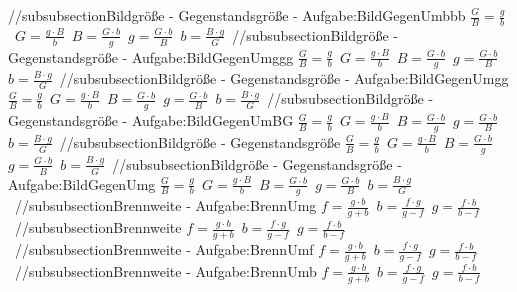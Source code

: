 //subsubsection{Bildgröße - Gegenstandsgröße - Aufgabe:BildGegenUmbbb} 
$ \frac{G}{B} = \frac{g}{b} $\ 
$ G = \frac{g\cdot B}{ b} $\ 
$ B = \frac{G\cdot b}{ g} $\ 
$ g = \frac{G\cdot b}{ B} $\ 
$ b = \frac{B\cdot g}{ G} $\ 
//subsubsection{Bildgröße - Gegenstandsgröße - Aufgabe:BildGegenUmggg} 
$ \frac{G}{B} = \frac{g}{b} $\ 
$ G = \frac{g\cdot B}{ b} $\ 
$ B = \frac{G\cdot b}{ g} $\ 
$ g = \frac{G\cdot b}{ B} $\ 
$ b = \frac{B\cdot g}{ G} $\ 
//subsubsection{Bildgröße - Gegenstandsgröße - Aufgabe:BildGegenUmgg} 
$ \frac{G}{B} = \frac{g}{b} $\ 
$ G = \frac{g\cdot B}{ b} $\ 
$ B = \frac{G\cdot b}{ g} $\ 
$ g = \frac{G\cdot b}{ B} $\ 
$ b = \frac{B\cdot g}{ G} $\ 
//subsubsection{Bildgröße - Gegenstandsgröße - Aufgabe:BildGegenUmBG} 
$ \frac{G}{B} = \frac{g}{b} $\ 
$ G = \frac{g\cdot B}{ b} $\ 
$ B = \frac{G\cdot b}{ g} $\ 
$ g = \frac{G\cdot b}{ B} $\ 
$ b = \frac{B\cdot g}{ G} $\ 
//subsubsection{Bildgröße - Gegenstandsgröße} 
$ \frac{G}{B} = \frac{g}{b} $\ 
$ G = \frac{g\cdot B}{ b} $\ 
$ B = \frac{G\cdot b}{ g} $\ 
$ g = \frac{G\cdot b}{ B} $\ 
$ b = \frac{B\cdot g}{ G} $\ 
//subsubsection{Bildgröße - Gegenstandsgröße - Aufgabe:BildGegenUmg} 
$ \frac{G}{B} = \frac{g}{b} $\ 
$ G = \frac{g\cdot B}{ b} $\ 
$ B = \frac{G\cdot b}{ g} $\ 
$ g = \frac{G\cdot b}{ B} $\ 
$ b = \frac{B\cdot g}{ G} $\ 
//subsubsection{Brennweite - Aufgabe:BrennUmg} 
$ f  = \frac{g\cdot b}{g+b} $\ 
$ b  = \frac{f\cdot g}{g-f} $\ 
$ g  = \frac{f\cdot b}{b-f} $\ 
//subsubsection{Brennweite} 
$ f  = \frac{g\cdot b}{g+b} $\ 
$ b  = \frac{f\cdot g}{g-f} $\ 
$ g  = \frac{f\cdot b}{b-f} $\ 
//subsubsection{Brennweite - Aufgabe:BrennUmf} 
$ f  = \frac{g\cdot b}{g+b} $\ 
$ b  = \frac{f\cdot g}{g-f} $\ 
$ g  = \frac{f\cdot b}{b-f} $\ 
//subsubsection{Brennweite - Aufgabe:BrennUmb} 
$ f  = \frac{g\cdot b}{g+b} $\ 
$ b  = \frac{f\cdot g}{g-f} $\ 
$ g  = \frac{f\cdot b}{b-f} $\ 
